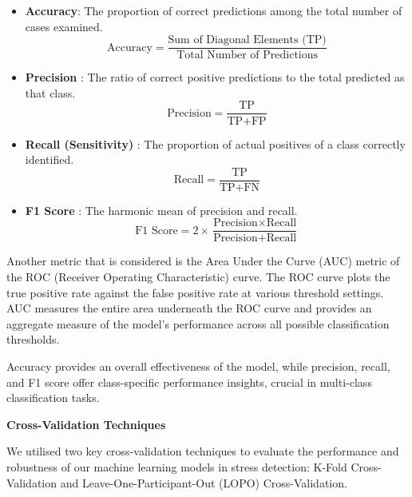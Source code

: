 \begin{itemize}
    \item \textbf{Accuracy}: The proportion of correct predictions among the total number of cases examined.
    \[ \text{Accuracy} = \frac{\text{Sum of Diagonal Elements (TP)}}{\text{Total Number of Predictions}} \]

    \item \textbf{Precision} : The ratio of correct positive predictions to the total predicted as that class.
    \[ \text{Precision} = \frac{\text{TP}}{\text{TP} + \text{FP}} \]

    \item \textbf{Recall (Sensitivity)} : The proportion of actual positives of a class correctly identified.
    \[ \text{Recall} = \frac{\text{TP}}{\text{TP} + \text{FN}} \]

    \item \textbf{F1 Score} : The harmonic mean of precision and recall.
    \[ \text{F1 Score} = 2 \times \frac{\text{Precision} \times \text{Recall}}{\text{Precision} + \text{Recall}} \]
\end{itemize}

Another metric that is considered is the Area Under the Curve (AUC) metric of the ROC (Receiver Operating Characteristic) curve.  The ROC curve plots the true positive rate against the false positive rate at various threshold settings. AUC measures the entire  area underneath the ROC curve and provides an aggregate measure of the model's performance across all possible classification thresholds.

Accuracy provides an overall effectiveness of the model, while precision, recall, and F1 score offer class-specific performance insights, crucial in multi-class classification tasks.


\textbf{Cross-Validation Techniques}

We utilised two key cross-validation techniques to evaluate the performance and robustness of our machine learning models in stress detection: K-Fold Cross-Validation and Leave-One-Participant-Out (LOPO) Cross-Validation.


